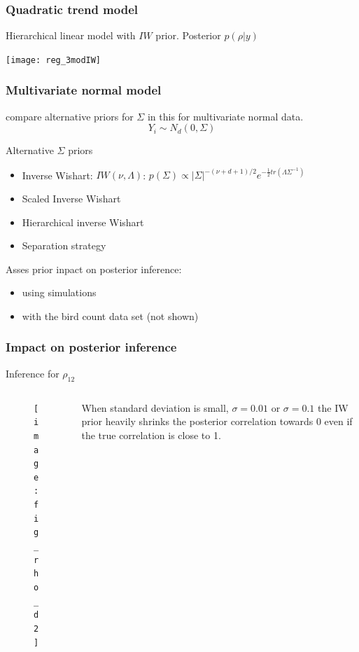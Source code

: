 \documentclass[9pt]{beamer}\usepackage[]{graphicx}\usepackage[]{color}
\begin{document}
\begin{frame}
\frametitle{Quadratic trend model}

Hierarchical linear model with $IW$ prior. Posterior $p(\rho | y)$

\begin{center}
\texttt{[image: reg\_3modIW]}
\end{center}

\end{frame}


\begin{frame}
\frametitle{ Multivariate normal model }

\cite{Alvarez2014} compare alternative priors for $\Sigma$ in this for multivariate normal data.
\[ Y_i \sim N_d(0, \Sigma) \]

Alternative $\Sigma$ priors
\begin{itemize}
\item Inverse Wishart: $IW(\nu, \Lambda)$:  $p(\Sigma) \propto  |\Sigma|^{-(\nu+ d +1)/2 } e^{-\frac{1}{2} tr( \Lambda \Sigma^{-1}) }$

\item Scaled Inverse Wishart
\item Hierarchical inverse Wishart
\item Separation strategy
\end{itemize}

Asses prior inpact on posterior inference:
\begin{itemize}
\item using simulations
\item with the bird count data set (not shown)
\end{itemize}
\end{frame}


\begin{frame}
\frametitle{Impact on posterior inference}
Inference for $\rho_{12}$
	\begin{columns}
	 \begin{column}{7cm}
		 \begin{figure}[hbtp]
		   \texttt{[image: fig\_rho\_d2]}
		\end{figure}
	\end{column}
	\begin{column}{4cm}
	When standard deviation is small, $\sigma=0.01$ or $\sigma=0.1$ the IW prior heavily shrinks the posterior correlation towards 0 even if the true correlation is close to 1.
	\end{column}
	\end{columns}
\end{frame}
\end{document}
